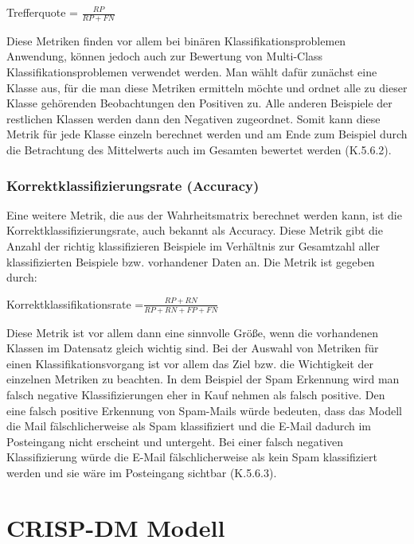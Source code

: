 \documentclass[12pt]{scrreprt}
\begin{document}
\begin{center}
	Trefferquote = $\frac{RP}{RP + FN}$
\end{center}

Diese Metriken finden vor allem bei binären Klassifikationsproblemen Anwendung, können jedoch auch zur Bewertung von Multi-Class Klassifikationsproblemen verwendet werden. Man wählt dafür zunächst eine Klasse aus, für die man diese Metriken ermitteln möchte und ordnet alle zu dieser Klasse gehörenden Beobachtungen den Positiven zu. Alle anderen Beispiele der restlichen Klassen werden dann den Negativen zugeordnet. Somit kann diese Metrik für jede Klasse einzeln berechnet werden und am Ende zum Beispiel durch die Betrachtung des Mittelwerts auch im Gesamten bewertet werden \cite{Burkov2019} (K.5.6.2).
	
\subsection{Korrektklassifizierungsrate (Accuracy) }
	
	Eine weitere Metrik, die aus der Wahrheitsmatrix berechnet werden kann, ist die Korrektklassifizierungsrate, auch bekannt als Accuracy. Diese Metrik gibt die Anzahl der richtig klassifizieren Beispiele im Verhältnis zur Gesamtzahl aller klassifizierten Beispiele bzw. vorhandener Daten an. Die Metrik ist gegeben durch:
	
\begin{center}
		Korrektklassifikationsrate  =$\frac{RP + RN}{RP + RN + FP + FN}$
\end{center}
	
Diese Metrik ist vor allem dann eine sinnvolle Größe, wenn die vorhandenen Klassen im Datensatz gleich wichtig sind. Bei der Auswahl von Metriken für einen Klassifikationsvorgang ist vor allem das Ziel bzw. die Wichtigkeit der einzelnen Metriken zu beachten. In dem Beispiel der Spam Erkennung wird man falsch negative Klassifizierungen eher in Kauf nehmen als falsch positive. Den eine falsch positive Erkennung von Spam-Mails würde bedeuten, dass das Modell die Mail fälschlicherweise als Spam klassifiziert und die E-Mail dadurch im Posteingang nicht erscheint und untergeht. Bei einer falsch negativen Klassifizierung würde die E-Mail fälschlicherweise als kein Spam klassifiziert werden und sie wäre im Posteingang sichtbar \cite{Burkov2019} (K.5.6.3).  
	
\newpage
\chapter{CRISP-DM Modell}
	
\end{document}
